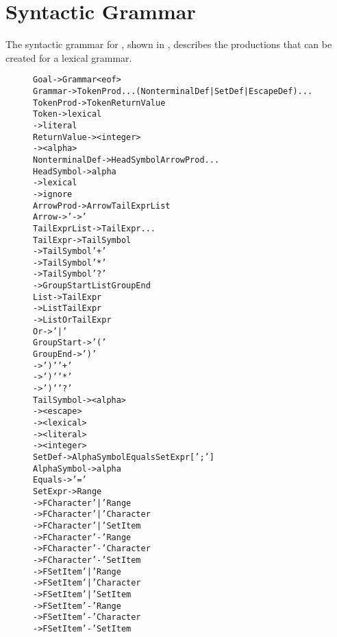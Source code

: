 \section{Syntactic Grammar}

The syntactic grammar for \dfae, shown in ,
describes the productions that can be created for a lexical grammar.

\begin{figure}[h]
  \begin{scriptsize}
    \begin{alltt}
      Goal              -> Grammar <eof>
      Grammar           -> TokenProd... (NonterminalDef|SetDef|EscapeDef)...
      TokenProd         -> Token ReturnValue
      Token             -> {lexical}
                        -> {literal}
      ReturnValue       -> <integer>
                        -> <alpha>
      NonterminalDef    -> HeadSymbol ArrowProd...
      HeadSymbol        -> {alpha}
                        -> {lexical}
                        -> {ignore}
      ArrowProd         -> Arrow TailExprList
      Arrow             -> '->'
      TailExprList      -> TailExpr...
      TailExpr          -> TailSymbol
                        -> TailSymbol '+'
                        -> TailSymbol '*'
                        -> TailSymbol '?'
                        -> GroupStart List GroupEnd
      List              -> TailExpr
                        -> List TailExpr
                        -> List Or TailExpr
      Or                -> '|'
      GroupStart        -> '('
      GroupEnd          -> ')'
                        -> ')' '+'
                        -> ')' '*'
                        -> ')' '?'
      TailSymbol        -> <alpha>
                        -> <escape>
                        -> <lexical>
                        -> <literal>
                        -> <integer>
      SetDef            -> AlphaSymbol Equals SetExpr [';']
      AlphaSymbol       -> {alpha}
      Equals            -> '='
      SetExpr           -> Range
                        -> FCharacter '|' Range
                        -> FCharacter '|' Character
                        -> FCharacter '|' SetItem
                        -> FCharacter '-' Range
                        -> FCharacter '-' Character
                        -> FCharacter '-' SetItem
                        -> FSetItem   '|' Range
                        -> FSetItem   '|' Character
                        -> FSetItem   '|' SetItem
                        -> FSetItem   '-' Range
                        -> FSetItem   '-' Character
                        -> FSetItem   '-' SetItem

\end{alltt}
\end{scriptsize}
\end{figure}
